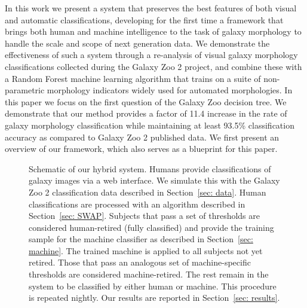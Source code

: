  In this work we present a system that preserves the best features of both visual 
and automatic classifications, developing for the first time a framework that 
brings both human and machine intelligence to the task of galaxy morphology to 
handle the scale and scope of next generation data. We demonstrate the 
effectiveness of such a system through a re-analysis of visual galaxy morphology
 classifications collected during the Galaxy Zoo 2 project, and combine these with a 
Random Forest machine learning algorithm that trains on a suite of non-parametric
 morphology indicators widely used for automated morphologies. 
In this paper we focus on the first question of the Galaxy Zoo 
decision tree. We demonstrate that our method 
provides a factor of 11.4 increase in the rate of galaxy morphology classification
 while maintaining at least 93.5\% classification accuracy as compared to Galaxy Zoo 2 published data. 
We first present an overview of our framework, which also serves as a blueprint for this paper. 


\begin{figure*}[ht!]
\caption[Schematic of the human+machine hybrid system.]{Schematic of our hybrid system. Humans provide classifications of galaxy images via a web interface. We simulate this with the Galaxy Zoo 2 classification data described in Section~\ref{sec: data}. Human classifications are processed with an algorithm described in Section~\ref{sec: SWAP}. Subjects that pass a set of thresholds are considered human-retired (fully classified) and provide the training sample for the machine classifier as described in Section~\ref{sec: machine}. The trained machine is applied to all subjects not yet retired. Those that pass an analogous set of machine-specific thresholds are considered machine-retired. The rest remain in the system to be classified by either human or machine. This procedure is repeated  nightly. Our results are reported in Section~\ref{sec: results}.  \label{fig: schematic}}
\end{figure*}


